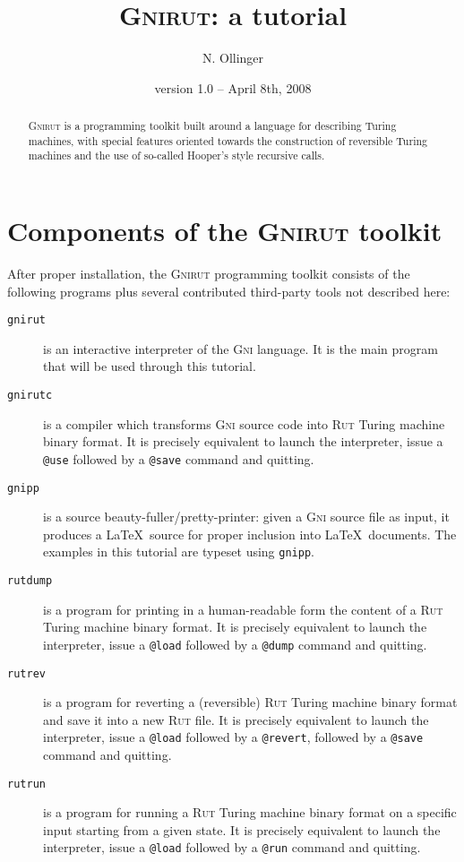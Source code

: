 \documentclass[a4paper,11pt]{article}
\title{\textsc{Gnirut}: a tutorial}
\author{N. Ollinger}
\date{version 1.0 -- April 8th, 2008}
\theoremstyle{remark}
\begin{document}
\maketitle
\begin{abstract}
\textsc{Gnirut} is a programming toolkit built around a language for describing Turing 
machines, with special features oriented towards the construction of reversible Turing machines and the 
use of so-called Hooper's style recursive calls.
\end{abstract}

\section{Components of the \textsc{Gnirut} toolkit}

After proper installation, the \textsc{Gnirut} programming toolkit consists of the following programs 
plus several contributed third-party tools not described here:
\begin{description}
	\item[\texttt{gnirut}] is an interactive interpreter of the \textsc{Gni} language. 
	It is the main program that will be used through this tutorial.
	\item[\texttt{gnirutc}] is a compiler which transforms \textsc{Gni} source code into \textsc{Rut}
	Turing machine binary format. It is precisely equivalent to launch the interpreter, issue a 
	\texttt{@use} followed by a \texttt{@save} command and quitting.
	\item[\texttt{gnipp}] is a source beauty-fuller/pretty-printer: given a \textsc{Gni} source file as 
	input, it produces a \LaTeX\ source for proper inclusion into \LaTeX\ documents. The examples in this 
	tutorial are typeset using \texttt{gnipp}.
	\item[\texttt{rutdump}] is a program for printing in a human-readable form the content of a 
	\textsc{Rut} 
	Turing machine binary format. It is precisely equivalent to launch the interpreter, issue a
	\texttt{@load} followed by a \texttt{@dump} command and quitting.
	\item[\texttt{rutrev}] is a program for reverting a (reversible) \textsc{Rut} 
	Turing machine binary format and save it into a new \textsc{Rut} file. 
	It is precisely equivalent to launch the interpreter, issue a
	\texttt{@load} followed by a \texttt{@revert}, followed by a \texttt{@save} command and quitting.
	\item[\texttt{rutrun}] 	is a program for running a 
	\textsc{Rut} 
	Turing machine binary format on a specific input starting from a given state. 
	It is precisely equivalent to launch the interpreter, issue a
	\texttt{@load} followed by a \texttt{@run} command and quitting.
\end{description}
\end{document}
